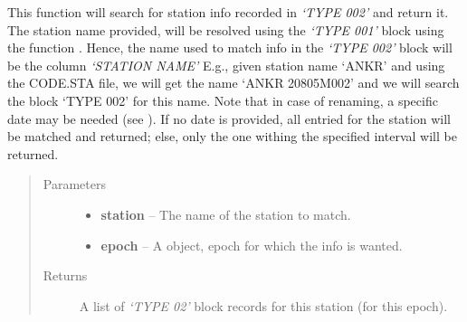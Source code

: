 \documentclass[letterpaper,10pt,english]{sphinxmanual}
\begin{document}
\begin{fulllineitems}

\begin{fulllineitems}
\label{bsta:bsta.stafile.findStationType02}
This function will search for station info recorded in \emph{`TYPE 002'}
and return it.
The station name provided, will be resolved using the \emph{`TYPE 001'}
block using the function . Hence, the name used to
match info in the \emph{`TYPE 002'} block will be the column \emph{`STATION NAME'}
E.g., given station name `ANKR' and using the CODE.STA file, we
will get the name `ANKR 20805M002' and we will search the block
`TYPE 002' for this name. Note that in case of renaming, a specific
date may be needed (see ).
If no date is provided, all entried for the station will be matched
and returned; else, only the one withing the specified interval
will be returned.
\begin{quote}\begin{description}
\item[{Parameters}] \leavevmode\begin{itemize}
\item {} 
\textbf{station} -- The name of the station to match.

\item {} 
\textbf{epoch} -- A  object, epoch for which the info is
wanted.

\end{itemize}

\item[{Returns}] \leavevmode
A list of \emph{`TYPE 02'} block records for this station
(for this epoch).

\end{description}\end{quote}

\end{fulllineitems}



\end{fulllineitems}
\end{document}
